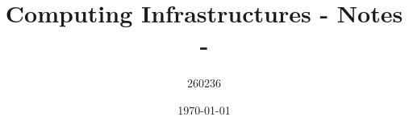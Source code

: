 \author{260236}
\title{Computing Infrastructures - Notes - \version}
\date{\printdayoff\today}
\maketitle